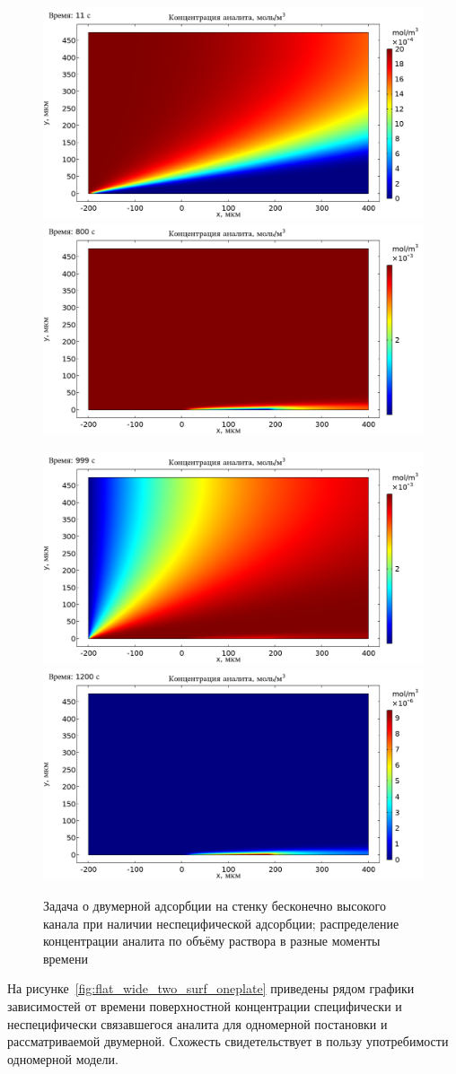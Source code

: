 \documentclass[oneside,final,12pt]{extreport}
\begin{document}
\begin{figure}
  \centering
  \includegraphics[width=.5\textwidth]{pic/flat_wide_twosurf_11s}%
  \includegraphics[width=.5\textwidth]{pic/flat_wide_twosurf_800s}

  \includegraphics[width=.5\textwidth]{pic/flat_wide_twosurf_999s}%
  \includegraphics[width=.5\textwidth]{pic/flat_wide_twosurf_1200s}

  \caption{%
    \label{fif:flat_wide_two_surf_concdistribs}%
    Задача о двумерной адсорбции на стенку бесконечно высокого канала
    при наличии неспецифической адсорбции;
    распределение концентрации аналита по объёму раствора в разные моменты времени
  }

\end{figure}

На рисунке~\ref{fig:flat_wide_two_surf_oneplate}
приведены рядом графики зависимостей от времени
поверхностной концентрации специфически и неспецифически связавшегося аналита
для одномерной постановки и рассматриваемой двумерной.
Схожесть свидетельствует в пользу употребимости одномерной модели.
\end{document}
